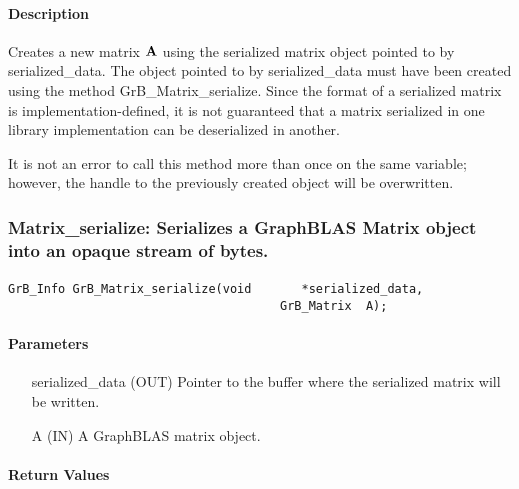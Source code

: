 \paragraph{Description}

Creates a new matrix ${\bf A}$ using the serialized matrix object pointed to
by {\sf serialized\_data}.  The object pointed to by {\sf serialized\_data}
must have been created using the method {\sf GrB\_Matrix\_serialize}.  Since
the format of a serialized matrix is implementation-defined, it is not guaranteed
that a matrix serialized in one library implementation can be deserialized in
another.

It is not an error to call this method more than once on the same variable;  
however, the handle to the previously created object will be overwritten. 


\subsubsection{{\sf Matrix\_serialize}: Serializes a GraphBLAS Matrix object into an opaque stream of bytes. }
\label{Sec:Matrix_serialize}

\paragraph{\syntax}

\begin{Verbatim}[samepage=true]
        GrB_Info GrB_Matrix_serialize(void       *serialized_data,
                                      GrB_Matrix  A);
\end{Verbatim}

\paragraph{Parameters}

\begin{itemize}[leftmargin=1.1in]
    \item[{\sf serialized\_data}] ({\sf OUT}) Pointer to the buffer where the serialized matrix will be written.
    \item[{\sf A}]      ({\sf IN}) A GraphBLAS matrix object.
\end{itemize}

\paragraph{Return Values}

